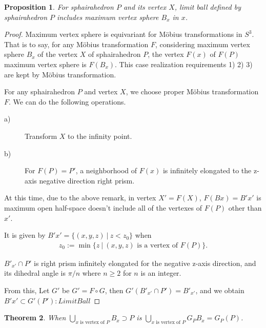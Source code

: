 \documentclass[suppldata, dvipdfmx]{interact}
\theoremstyle{plain}%
\newtheorem{theorem}{Theorem}[section]
\newtheorem{proposition}[theorem]{Proposition}
\theoremstyle{definition}
\theoremstyle{remark}
\theoremstyle{problemstyle}
\begin{document}
\begin{proposition}\label{prop:limitBall}
 For sphairahedron $P$ and its vertex $X$, limit ball defined by
 sphairahedron $P$ includes maximum vertex sphere $B_x$ in $x$.
\end{proposition}

\begin{proof}
 Maximum vertex sphere is equivariant for M\"obius transformations in
 $S^3$. That is to say, for any M\"obius transformation $F$,
 considering maximum vertex sphere $B_x$ of the vertex $X$ of
 sphairahedron $P$,
 the vertex $F(x)$ of $F(P)$ maximum vertex sphere is $F(B_x)$.
 This case realization requirements 1) 2) 3) are kept by M\"obius
 transformation. 

 For any sphairahedron $P$ and vertex $X$, we choose proper M\"obius
 transformation $F$. We can do the following operations.
 \begin{description}
  \item[a)] Transform $X$ to the infinity point.
  \item[b)] For $F(P)=P'$, a neighborhood of $F(x)$ is infinitely elongated
             to the z-axis negative direction right prism.
 \end{description}
 At this time, due to the above remark, in vertex $X' = F(X)$,
 $F(Bx) = B'x'$ is maximum open half-space doesn't include all of the
 vertexes of $F(P)$ other than $x'$.
 
 It is given by $B'x' = \{(x, y, z)~|~z < z_0\}$ when
\begin{align*}
z_0 := \min\{ z~|~(x, y, z) \text{ is a vertex of } F(P) \}.
\end{align*}

 $B'_{x'} \cap P'$ is right prism infinitely elongated for the negative
 z-axis direction, and its dihedral angle is $\pi/n$ where $n \geq 2$
 for $n$ is an integer.

 From this, Let $G'$ be $G'=F \circ G$, then
 $G'(B'_{x'} \cap P') = B'_{x'}$, and
 we obtain $B'x' \subset G'(P') : Limit Ball$
\end{proof}

\begin{theorem}
 When $\displaystyle\bigcup_{x \text{ is vertex of } P} B_x \supset P$ is
 $\displaystyle\bigcup_{x \text{ is vertex of } P} G_P{B_x} = G_{P}(P)$.
\end{theorem}
\end{document}
